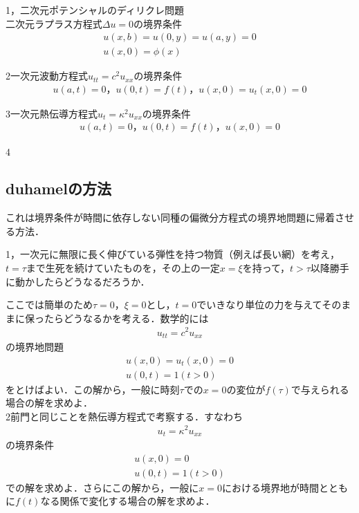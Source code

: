 \documentclass[a4j]{jarticle}
\begin{document}
1，二次元ポテンシャルのディリクレ問題\\
二次元ラプラス方程式$\Delta u=0$の境界条件
\begin{align*}
 u(x,b)=u(0,y)=u(a,y)=0\\
 u(x,0)=\phi (x)
\end{align*}

2一次元波動方程式$u_{tt}=c^2u_{xx}$の境界条件
\begin{align*}
 u(a,t)=0，u(0,t)=f(t)，u(x,0)=u_t(x,0)=0
\end{align*}

3一次元熱伝導方程式$u_t=\kappa^2u_{xx}$の境界条件
\begin{align*}
 u(a,t)=0，u(0,t)=f(t)，u(x,0)=0
\end{align*}

4




\subsection{duhamelの方法}
これは境界条件が時間に依存しない同種の偏微分方程式の境界地問題に帰着させる方法．

1，一次元に無限に長く伸びている弾性を持つ物質（例えば長い網）を考え，$t=\tau$まで生死を続けていたものを，その上の一定$x=\xi$を持って，$t>\tau$以降勝手に動かしたらどうなるだろうか．

ここでは簡単のため$\tau=0$，$\xi=0$とし，$t=0$でいきなり単位の力を与えてそのままに保ったらどうなるかを考える．数学的には
\begin{align*}
 u_{tt}=c^2u_{xx}
\end{align*}
の境界地問題
\begin{align*}
 u(x,0)=u_t(x,0)=0\\
 u(0,t)=1(t>0)
\end{align*}
をとけばよい．この解から，一般に時刻$\tau$での$x=0$の変位が$f(\tau)$で与えられる場合の解を求めよ．
\\



2前門と同じことを熱伝導方程式で考察する．すなわち
\begin{align*}
 u_t=\kappa^2u_{xx}
\end{align*}
の境界条件
\begin{align*}
 u(x,0)=0\\
 u(0,t)=1(t>0)
\end{align*}
での解を求めよ．さらにこの解から，一般に$x=0$における境界地が時間とともに$f(t)$なる関係で変化する場合の解を求めよ．\\
\end{document}
